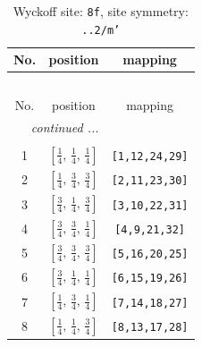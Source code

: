 \documentclass[fleqn,8pt]{jsarticle}
\begin{document}
\begin{longtable}{ccc}
\caption{Wyckoff site: {\tt 8f}, site symmetry: {\tt ..2/m'}}
 \\
 \hline \hline
No. & position & mapping \\ \hline \endfirsthead

\multicolumn{2}{l}{\tablename\ \thetable{}} \\
 \hline \hline
No. & position & mapping \\ \hline \endhead

 \hline \hline
\multicolumn{2}{r}{\footnotesize\it continued ...} \\ \endfoot

 \hline \hline
\multicolumn{2}{r}{} \\ \endlastfoot

1 & $\left[ \frac{1}{4},\, \frac{1}{4},\, \frac{1}{4} \right]$ & {\tt [1,12,24,29]} \\ \hline
2 & $\left[ \frac{1}{4},\, \frac{3}{4},\, \frac{3}{4} \right]$ & {\tt [2,11,23,30]} \\ \hline
3 & $\left[ \frac{3}{4},\, \frac{1}{4},\, \frac{3}{4} \right]$ & {\tt [3,10,22,31]} \\ \hline
4 & $\left[ \frac{3}{4},\, \frac{3}{4},\, \frac{1}{4} \right]$ & {\tt [4,9,21,32]} \\ \hline
5 & $\left[ \frac{3}{4},\, \frac{3}{4},\, \frac{3}{4} \right]$ & {\tt [5,16,20,25]} \\ \hline
6 & $\left[ \frac{3}{4},\, \frac{1}{4},\, \frac{1}{4} \right]$ & {\tt [6,15,19,26]} \\ \hline
7 & $\left[ \frac{1}{4},\, \frac{3}{4},\, \frac{1}{4} \right]$ & {\tt [7,14,18,27]} \\ \hline
8 & $\left[ \frac{1}{4},\, \frac{1}{4},\, \frac{3}{4} \right]$ & {\tt [8,13,17,28]} \\
\end{longtable}
\renewcommand{\arraystretch}{1.2}
\end{document}

